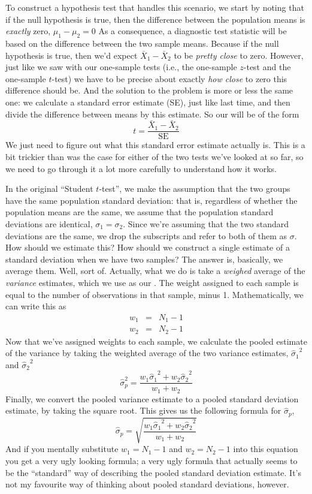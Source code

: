 To construct a hypothesis test that handles this scenario, we start by noting that if the null hypothesis is true, then the difference between the population means is {\it exactly} zero, 
$\mu_1 - \mu_2 = 0$
As a consequence, a diagnostic test statistic will be based on the difference between the two sample means. Because if the null hypothesis is true, then we'd expect 
$
\bar{X}_1 - \bar{X}_2
$
to be {\it pretty close} to zero. However, just like we saw with our one-sample tests (i.e., the one-sample $z$-test and the one-sample $t$-test) we have to be precise about exactly {\it how close} to zero this difference should be. And the solution to the problem is more or less the same one: we calculate a standard error estimate (SE), just like last time, and then divide the difference between means by this estimate. So our  will be of the form
$$
t = \frac{\bar{X}_1 - \bar{X}_2}{\mbox{SE}}
$$
We just need to figure out what this standard error estimate actually is. This is a bit trickier than was the case for either of the two tests we've looked at so far, so we need to go through it a lot more carefully to understand how it works.


In the original ``Student $t$-test'', we make the assumption that the two groups have the same population standard deviation: that is, regardless of whether the population means are the same, we assume that the population standard deviations are identical, $\sigma_1 = \sigma_2$. Since we're assuming that the two standard deviations are the same, we drop the subscripts and refer to both of them as $\sigma$. How should we estimate this? How should we construct a single estimate of a standard deviation when we have two samples? The answer is, basically, we average them. Well, sort of. Actually, what we do is take a {\it weighed} average of the {\it variance} estimates, which we use as our . The weight assigned to each sample is equal to the number of observations in that sample, minus 1. Mathematically, we can write this as
$$
\begin{array}{rcl}
w_1 &=& N_1 - 1\\
w_2 &=& N_2 - 1
\end{array}
$$
Now that we've assigned weights to each sample, we calculate the pooled estimate of the variance by taking the weighted average of the two variance estimates, ${\hat\sigma_1}^2$ and ${\hat\sigma_2}^2$ 
$$
\hat\sigma^2_p = \frac{w_1 {\hat\sigma_1}^2 + w_2 {\hat\sigma_2}^2}{w_1 + w_2}
$$
Finally, we convert the pooled variance estimate to a pooled standard deviation estimate, by taking the square root. This gives us the following formula for $\hat\sigma_p$,
$$
\hat\sigma_p = \sqrt{\frac{w_1 {\hat\sigma_1}^2 + w_2 {\hat\sigma_2}^2}{w_1 + w_2}}
$$
And if you mentally substitute $w_1 = N_1 -1$ and $w_2 = N_2 -1$ into this equation you get a very ugly looking formula; a very ugly formula that actually seems to be the ``standard'' way of describing the pooled standard deviation estimate. It's not my favourite way of thinking about pooled standard deviations, however. 

